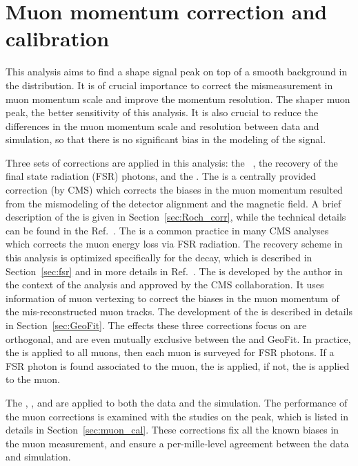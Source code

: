 \chapter{Muon momentum correction and calibration} \label{chp:muon_corr}

This analysis aims to find a shape signal peak on top of a smooth background in the \mmm distribution.
It is of crucial importance to correct the mismeasurement in muon momentum scale and improve the momentum resolution.
The shaper muon peak, the better sensitivity of this analysis.
It is also crucial to reduce the differences in the muon momentum scale and resolution between data and simulation, 
so that there is no significant bias in the modeling of the signal.

Three sets of corrections are applied in this analysis: 
the \RochCorr~\cite{Bodek:2012id}, the recovery of the final state radiation (FSR) photons, and the \GeoFit.
The \RochCorr is a centrally provided correction (by CMS) which corrects 
the biases in the muon momentum resulted from the mismodeling of the detector alignment and the magnetic field. 
A brief description of the \RochCorr is given in Section~\ref{sec:Roch_corr}, 
while the technical details can be found in the Ref.~\cite{Bodek:2012id}.
The \FSR is a common practice in many CMS analyses which corrects the muon energy loss via FSR radiation.
The recovery scheme in this analysis is optimized specifically for the \hmm decay, which is described in Section~\ref{sec:fsr} and in more details in Ref.~\cite{}.
The \GeoFit is developed by the author in the context of the \hmm analysis and approved by the CMS collaboration.
It uses information of muon vertexing to correct the biases in the muon momentum of the mis-reconstructed muon tracks.
The development of the \GeoFit is described in details in Section~\ref{sec:GeoFit}.
The effects these three corrections focus on are orthogonal, and are even mutually exclusive between the \FSR and GeoFit.
In practice, the \RochCorr is applied to all muons, then each muon is surveyed for FSR photons.
If a FSR photon is found associated to the muon, the \FSR is applied, 
if not, the \GeoFit is applied to the muon.

The \RochCorr, \FSR, and \GeoFit are applied to both the data and the simulation.
The performance of the muon corrections is examined with the studies on the \zmm peak,
which is listed in details in Section~\ref{sec:muon_cal}.
These corrections fix all the known biases in the muon measurement, 
and ensure a per-mille-level agreement between the data and simulation. 

